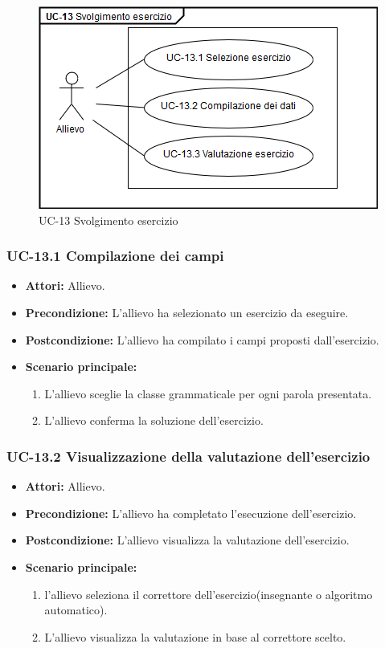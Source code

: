 			\begin{figure}[h]
		\centering
		\includegraphics[scale=0.7]{images/UC-13_1.png}
		\caption{UC-13 Svolgimento esercizio}
	\end{figure}

	\subsubsection{UC-13.1 Compilazione dei campi}
		\begin{itemize}
			\item \textbf{Attori:} Allievo.
			\item \textbf{Precondizione:} L'allievo ha selezionato un esercizio da eseguire.
			\item \textbf{Postcondizione:} L'allievo ha compilato i campi proposti dall'esercizio.
			\item \textbf{Scenario principale:}
				\begin{enumerate}
					\item L'allievo sceglie la classe grammaticale per ogni parola presentata.
					\item L'allievo conferma la soluzione dell'esercizio.
				\end{enumerate}
		\end{itemize}

	\subsubsection{UC-13.2 Visualizzazione della valutazione dell'esercizio}
	\begin{itemize}
			\item \textbf{Attori:} Allievo.
			\item \textbf{Precondizione:} L'allievo ha completato l'esecuzione dell'esercizio.
			\item \textbf{Postcondizione:} L'allievo visualizza la valutazione dell'esercizio.
			\item \textbf{Scenario principale:}
				\begin{enumerate}
					\item l'allievo seleziona il correttore dell'esercizio(insegnante o algoritmo automatico).
					\item L'allievo visualizza la valutazione in base al correttore scelto.
				\end{enumerate}
			\end{itemize}				
			
